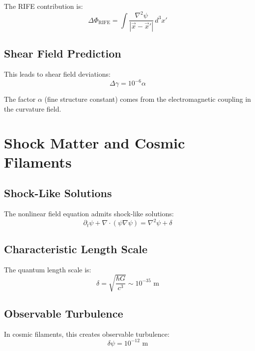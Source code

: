\documentclass[11pt]{article}
\begin{document}
The RIFE contribution is:
\begin{equation}
\Delta\Phi_{\text{RIFE}} = \int \frac{\nabla^2\psi}{|\vec{x}-\vec{x}'|} \, d^3x'
\end{equation}

\subsection{Shear Field Prediction}
This leads to shear field deviations:
\begin{equation}
\Delta\gamma = 10^{-6}\alpha
\end{equation}

The factor $\alpha$ (fine structure constant) comes from the electromagnetic coupling in the curvature field.

\section{Shock Matter and Cosmic Filaments}

\subsection{Shock-Like Solutions}
The nonlinear field equation admits shock-like solutions:
\begin{equation}
\partial_t\psi + \nabla \cdot (\psi\nabla\psi) = \nabla^2\psi + \delta
\end{equation}

\subsection{Characteristic Length Scale}
The quantum length scale is:
\begin{equation}
\delta = \sqrt{\frac{\hbar G}{c^3}} \sim 10^{-35} \text{ m}
\end{equation}

\subsection{Observable Turbulence}
In cosmic filaments, this creates observable turbulence:
\begin{equation}
\delta\psi = 10^{-12} \text{ m}
\end{equation}
\end{document}
